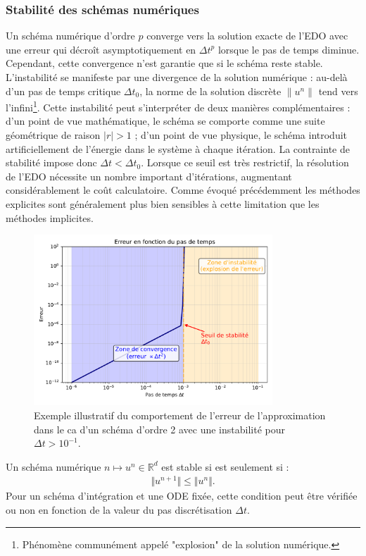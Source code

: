 \subsubsection{Stabilité des schémas numériques}
Un schéma numérique d'ordre $p$ converge vers la solution exacte de l'EDO avec une erreur qui décroît asymptotiquement en $\Delta t^p$ lorsque le pas de temps diminue.
Cependant, cette convergence n'est garantie que si le schéma reste stable.
L'instabilité se manifeste par une divergence de la solution numérique : au-delà d'un pas de temps critique $\Delta t_0$, la norme de la solution discrète $\|u^n\|$ tend vers l'infini\footnote{Phénomène communément appelé "explosion" de la solution numérique.}.
Cette instabilité peut s'interpréter de deux manières complémentaires : d'un point de vue mathématique, le schéma se comporte comme une suite géométrique de raison $|r| > 1$ ; d'un point de vue physique, le schéma introduit artificiellement de l'énergie dans le système à chaque itération.
La contrainte de stabilité impose donc $\Delta t < \Delta t_0$. Lorsque ce seuil est très restrictif, la résolution de l'EDO nécessite un nombre important d'itérations, augmentant considérablement le coût calculatoire. 
Comme évoqué précédemment les méthodes explicites sont généralement plus bien sensibles à cette limitation que les méthodes implicites.
\begin{figure}[htbp]
    \centering
    \includegraphics[width=0.8\textwidth]{media/3_/2_/exemple_satabilite.pdf}
    \caption{Exemple illustratif du comportement de l'erreur de l'approximation dans le ca d'un schéma d'ordre 2 avec une instabilité pour $\Delta t > 10^{-1}$.}
    \label{fig:stabilite_schema}
\end{figure}
\begin{definition}
    Un schéma numérique $n \mapsto u^n \in \mathbb{R}^d$ est stable si est seulement si :
    \begin{align}
        \Vert u^{n+1} \Vert \leq \Vert u^n \Vert.
    \end{align}
    Pour un schéma d'intégration et une ODE fixée, cette condition peut être vérifiée ou non en fonction de la valeur 
    du pas discrétisation $\Delta t$.
\end{definition}
